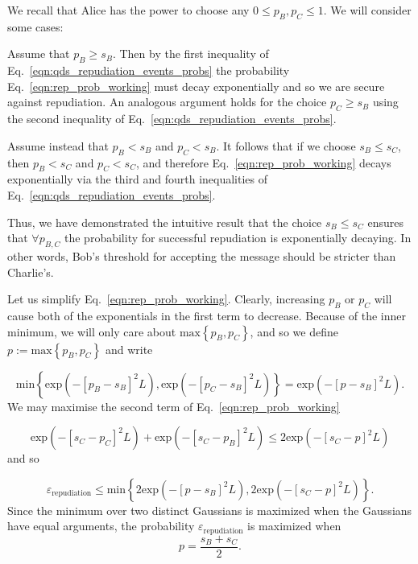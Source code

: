 
We recall that Alice has the power to choose any $0 \le p_B, p_C \le 1$. We will consider some cases:

\noindent Assume that $p_B \ge s_B$. Then by the first inequality of Eq.~\ref{eqn:qds_repudiation_events_probs} the probability Eq.~\ref{eqn:rep_prob_working} must decay exponentially %
and so we are secure against repudiation. An analogous argument holds for the choice $p_C \ge s_B$ using the second inequality of Eq.~\ref{eqn:qds_repudiation_events_probs}.

\noindent Assume instead that $p_B < s_B$ and $p_C < s_B$. It follows that if we choose $s_B \le s_C$, then $p_B < s_C$ and $p_C < s_C$, and therefore Eq.~\ref{eqn:rep_prob_working} decays exponentially via the third and fourth inequalities of Eq.~\ref{eqn:qds_repudiation_events_probs}.

Thus, we have demonstrated the intuitive result that the choice $s_B \le s_C$ ensures that $\forall p_{B, C}$ the probability for successful repudiation is exponentially decaying. In other words, Bob's threshold for accepting the message should be stricter than Charlie's.

Let us simplify Eq.~\ref{eqn:rep_prob_working}. Clearly, increasing $p_B$ or $p_C$ will cause both of the exponentials in the first term to decrease. Because of the inner minimum, we will only care about $\text{max}\left\{p_B, p_C\right\}$, and so we define $p := \text{max}\left\{p_B, p_C\right\}$ and write

\begin{equation}
\text{min}\left\{\text{exp}\left(- \left[p_B - s_B\right]^2L\right), \text{exp}\left(- \left[p_C - s_B\right]^2L\right)\right\} = \text{exp}\left(-\left[p - s_B\right]^2L\right).
\end{equation}
We may maximise the second term of Eq.~\ref{eqn:rep_prob_working} 

\begin{equation}
\text{exp}\left(- \left[s_C - p_C\right]^2 L \right) + \text{exp}\left(- \left[s_C - p_B\right]^2 L \right) \le 2 \text{exp}\left( - \left[s_C - p\right]^2 L\right)
\end{equation}
and so

\begin{equation}
\varepsilon_{\text{repudiation}} \le \text{min}\left\{ 2 \text{exp}\left( - \left[p - s_B\right]^2 L \right), 2 \text{exp}\left( - \left[s_C - p\right]^2 L \right) \right\}.
\end{equation}
Since the minimum over two distinct Gaussians is maximized when the Gaussians have equal arguments, the probability $\varepsilon_{\text{repudiation}}$ is maximized when 
\begin{equation}
p = \frac{s_B + s_C}{2}.
\end{equation}

